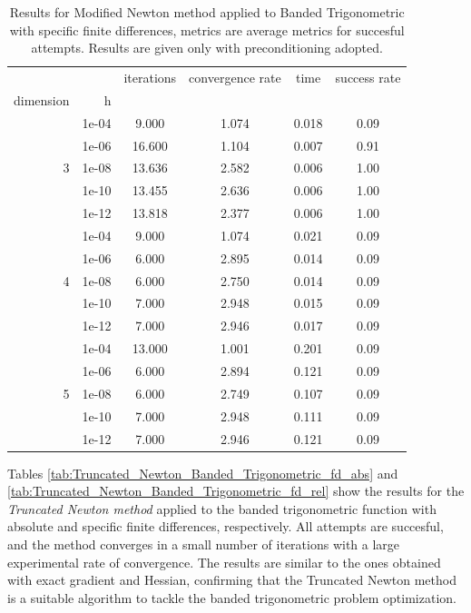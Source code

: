 \begin{table}
\centering
\caption{Results for Modified Newton method applied to Banded Trigonometric with specific finite differences, metrics are average metrics for succesful attempts. Results are given only with preconditioning adopted.}
\label{tab:Modified_Newton_Banded_Trigonometric_fd_rel}
\begin{tabular}{rr|cccc}
\toprule
    &  & iterations & convergence rate & time & success rate \\
dimension & h &  &  &  &  \\
\midrule
\multirow[t]{5}{*}{3} & 1e-04 & 9.000 & 1.074 & 0.018 & 0.09 \\
    & 1e-06 & 16.600 & 1.104 & 0.007 & 0.91 \\
    & 1e-08 & 13.636 & 2.582 & 0.006 & 1.00 \\
    & 1e-10 & 13.455 & 2.636 & 0.006 & 1.00 \\
    & 1e-12 & 13.818 & 2.377 & 0.006 & 1.00 \\
\cline{1-6}
\multirow[t]{5}{*}{4} & 1e-04 & 9.000 & 1.074 & 0.021 & 0.09 \\
    & 1e-06 & 6.000 & 2.895 & 0.014 & 0.09 \\
    & 1e-08 & 6.000 & 2.750 & 0.014 & 0.09 \\
    & 1e-10 & 7.000 & 2.948 & 0.015 & 0.09 \\
    & 1e-12 & 7.000 & 2.946 & 0.017 & 0.09 \\
\cline{1-6}
\multirow[t]{5}{*}{5} & 1e-04 & 13.000 & 1.001 & 0.201 & 0.09 \\
    & 1e-06 & 6.000 & 2.894 & 0.121 & 0.09 \\
    & 1e-08 & 6.000 & 2.749 & 0.107 & 0.09 \\
    & 1e-10 & 7.000 & 2.948 & 0.111 & 0.09 \\
    & 1e-12 & 7.000 & 2.946 & 0.121 & 0.09 \\
\cline{1-6}
\bottomrule
\end{tabular}
\end{table}

Tables \ref{tab:Truncated_Newton_Banded_Trigonometric_fd_abs} and \ref{tab:Truncated_Newton_Banded_Trigonometric_fd_rel} show the results for the \textit{Truncated Newton method} applied to the banded trigonometric function with absolute and specific finite differences, respectively.
All attempts are succesful, and the method converges in a small number of iterations with a large experimental rate of convergence.
The results are similar to the ones obtained with exact gradient and Hessian, confirming that the Truncated Newton method is a suitable algorithm to tackle the banded trigonometric problem optimization.

